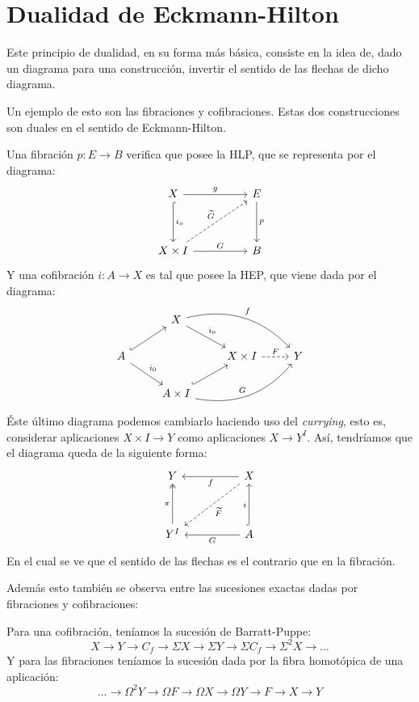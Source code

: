 \section{Dualidad de Eckmann-Hilton}
Este principio de dualidad, en su forma más básica, consiste en la idea de, dado un diagrama para una construcción, invertir el sentido de las flechas de dicho diagrama. \par 
Un ejemplo de esto son las fibraciones y cofibraciones. Estas dos construcciones son duales en el sentido de Eckmann-Hilton. \par
Una fibración $p : E \longrightarrow B$ verifica que posee la HLP, que se representa por el diagrama:
\[
\begin{tikzcd}
X \arrow{rr}{g} \arrow[hook]{dd}{i_o} &  & E \arrow{dd}{p} \\
\\
X \times I \arrow{rr}{G} \arrow[dashed]{uurr}{\widetilde{G}} & & B
\end{tikzcd}
\]
Y una cofibración $i : A \longrightarrow X$ es tal que posee la HEP, que viene dada por el diagrama:
\[
\begin{tikzcd}
	{} 						  & X \drar{i_0} \arrow[bend left]{drr}{f}			   &        					&   \\
	A \urar[hook] \drar{i_0}  &   												   & X \times I \rar[dashed]{F} & Y \\
	   						  & A \times I  \urar[hook] \arrow[bend right]{urr}{G} &   							&
\end{tikzcd}
\]
Éste último diagrama podemos cambiarlo haciendo uso del \textit{currying}, esto es, considerar aplicaciones $X \times I \longrightarrow Y$ como aplicaciones $X \longrightarrow Y^I$. Así, tendríamos que el diagrama queda de la siguiente forma:\[
\begin{tikzcd}
Y & & X \arrow{ll}{f} \arrow[dashed]{ddll}{\widetilde{F}} \\
\\
Y^I \arrow[two heads]{uu}{\pi} & & A \arrow[hook]{uu}{i} \arrow{ll}{G}
\end{tikzcd}
\]
En el cual se ve que el sentido de las flechas es el contrario que en la fibración. \par
Además esto también se observa entre las sucesiones exactas dadas por fibraciones y cofibraciones: \par
Para una cofibración, teníamos la sucesión de Barratt-Puppe:
\[ X \longrightarrow Y \longrightarrow C_f \longrightarrow \Sigma X \longrightarrow \Sigma Y \longrightarrow \Sigma C_f \longrightarrow \Sigma^2 X \longrightarrow \dots \]
Y para las fibraciones teníamos la sucesión dada por la fibra homotópica de una aplicación:
\[ \dots \longrightarrow \Omega^2 Y \longrightarrow \Omega F \longrightarrow \Omega X \longrightarrow \Omega Y \longrightarrow F \longrightarrow X \longrightarrow Y \]
